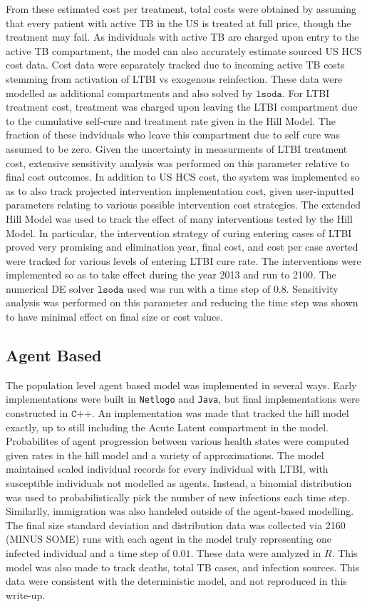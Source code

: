 \documentclass{amsart}
\begin{document}
From these estimated cost per treatment, total costs were obtained by assuming
that every patient with active TB in the US is treated at full price, though the
treatment may fail. As individuals with active
TB are charged upon entry to the active TB compartment, the model can also
accurately estimate sourced US HCS cost data. Cost data were separately tracked
due to incoming active TB costs stemming from activation of LTBI vs exogenous
reinfection. These data were modelled as additional compartments and also solved
by $\texttt{lsoda}$. For LTBI treatment cost, treatment was
charged upon leaving the LTBI compartment due to the cumulative self-cure and
treatment rate given in the Hill Model. The fraction of these indviduals who
leave this compartment due to self cure was assumed to be zero. Given the
uncertainty in measurments of LTBI treatment cost, extensive sensitivity
analysis was performed on this parameter relative to final cost outcomes. In
addition to US HCS cost, the system was implemented so as to also track
projected intervention implementation cost, given user-inputted parameters
relating to various possible intervention cost strategies. The extended Hill
Model was used to track the effect of many interventions tested by the Hill
Model. In particular, the intervention strategy of curing entering cases of LTBI
proved very promising and elimination year, final cost, and cost per case
averted were tracked for various levels of entering LTBI cure rate. The
interventions were implemented so as to take effect during the year 2013 and run
to 2100. The numerical DE solver $\texttt{lsoda}$ used was run with a time step
of $0.8$. Sensitivity analysis was performed on this parameter and reducing the
time step was shown to have minimal effect on final size or cost values.

\subsection{Agent Based}
The population level agent based model was implemented in several ways. Early
implementations were built in \texttt{Netlogo} and \texttt{Java}, but final
implementations were constructed in $\texttt{C++}$. An implementation was made
that tracked the hill model exactly, up to still including the Acute Latent
compartment in the model. Probabilites of agent progression between various
health states were computed given rates in the hill model and a variety of
approximations. The model maintained scaled individual records for every
individual with LTBI, with susceptible individuals not modelled as agents.
Instead, a binomial distribution was used to probabilistically pick the number
of new infections each time step. Similarlly, immigration was also handeled
outside of the agent-based modelling. The final size standard deviation and
distribution data was collected via 2160 (MINUS SOME) runs with each agent in
the model truly representing one infected individual and a time step of $0.01$.
These data were analyzed in $R$. This model was also made to track deaths, total
TB cases, and infection sources. This data were consistent with the
deterministic model, and not reproduced in this write-up. 
\end{document}
